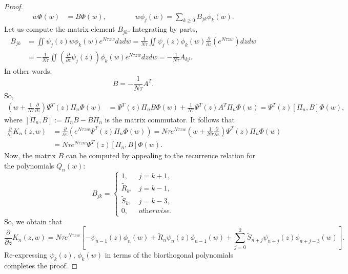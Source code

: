 \documentclass[10pt,a4paper]{amsart}
\begin{document}
\begin{proof}
\begin{align*}
        w\Phi(w) &= B\Phi(w),\qquad\qquad w\phi_j(w) = \sum_{k\geq 0} B_{jk}\phi_k(w).
    \end{align*}
Let us compute the matrix element $B_{jk}$. Integrating by parts,
    \begin{align*}
        B_{jk} &= \iint \psi_j(z)w\phi_k(w)e^{N\tau zw}dzdw = \frac{1}{N\tau}\iint \psi_j(z)\phi_k(w)\frac{\partial}{\partial z}\left(e^{N\tau zw}\right)dzdw\\
        &= -\frac{1}{N\tau}\iint\left(\frac{\partial}{\partial z}\psi_j(z)\right)\phi_k(w)e^{N\tau zw}dzdw = -\frac{1}{N\tau} A_{kj}.
    \end{align*}
In other words,
    \begin{equation}
        B = -\frac{1}{N\tau} A^T.
    \end{equation}
So,
    \begin{align*}
        \left(w+\frac{1}{N\tau}\frac{\partial}{\partial z}\right)\Psi^T(z)\Pi_n\Phi(w) &= \Psi^T(z)\Pi_n B\Phi(w) + \frac{1}{N\tau}\Psi^T(z)A^T\Pi_n\Phi(w) = \Psi^T(z)\left[\Pi_n,B\right]\Phi(w),
    \end{align*}
where $\left[\Pi_n,B\right] := \Pi_n B - B \Pi_n$ is the matrix commutator. It follows that
    \begin{align*}
        \frac{\partial}{\partial z} K_n(z,w) &= \frac{\partial}{\partial z}\left(e^{N\tau zw} \Psi^T(z)\Pi_n \Phi(w)\right) = N\tau e^{N\tau zw}\left(w + \frac{1}{N\tau}\frac{\partial}{\partial z}\right)\Psi^T(z)\Pi_n \Phi(w)\\
        &= N\tau e^{N\tau zw}\Psi^T(z)\left[\Pi_n,B\right]\Phi(w).
    \end{align*}
Now, the matrix $B$ can be computed by appealing to the recurrence relation for the polynomials $Q_n(w)$:
    \begin{equation}
        B_{jk} = 
        \begin{cases}
            1, & j = k+1,\\
            \tilde{R}_k, & j = k-1,\\
            \tilde{S}_k, & j = k-3,\\
            0, & \textit{otherwise}.
        \end{cases}
    \end{equation}
So, we obtain that
    \begin{equation*}
        \frac{\partial}{\partial z}K_n(z,w) = N\tau e^{N\tau zw}\left[-\psi_{n-1}(z)\phi_n(w) + \tilde{R}_n\psi_n(z)\phi_{n-1}(w) + \sum_{j=0}^{2}\tilde{S}_{n+j} \psi_{n+j}(z)\phi_{n+j-3}(w)\right].
    \end{equation*}
Re-expressing $\psi_k(z)$, $\phi_k(w)$ in terms of the biorthogonal polynomials completes the proof.
\end{proof}
\end{document}

